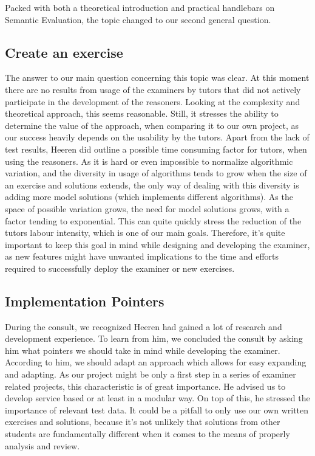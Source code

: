 Packed with both a theoretical introduction and practical handlebars on
Semantic Evaluation, the topic changed to our second general question.

\subsection{Create an exercise}
The answer to our main question concerning this topic was clear. At this moment
there are no results from usage of the examiners by tutors that did not
actively participate in the development of the reasoners. Looking at the 
complexity and theoretical approach, this seems reasonable. Still, it stresses
the ability to determine the value of the approach, when comparing it to our 
own project, as our success heavily depends on the usability by the tutors. 
Apart from the lack of test results, Heeren did outline a possible time
consuming factor for tutors, when using the reasoners. As it is hard or even 
impossible to normalize algorithmic variation, and the diversity in usage of 
algorithms tends to grow when the size of an exercise and solutions extends, 
the only way of dealing with this diversity is adding more model solutions 
(which implements different algorithms). 
As the space of possible variation grows, the need
for model solutions grows, with a factor tending to exponential. This can 
quite quickly stress the reduction of the tutors labour intensity, which is one 
of our main goals. Therefore, it's quite important to keep this goal in mind
while designing and developing the examiner, as new features might have 
unwanted implications to the time and efforts required to successfully deploy 
the \gls{examiner} or new \glspl{exercise}.

\subsection{Implementation Pointers}
During the consult, we recognized Heeren had gained a lot of research and 
development experience. To learn from him, we concluded the consult by 
asking him what pointers we should take in mind while developing the 
\gls{examiner}. According to him, we should adapt an approach which allows for 
easy expanding and adapting. As our project might be only a first step in a
series of \gls{examiner} related projects, this characteristic is of great 
importance. He advised us to develop service based or at least in a modular 
way. On top of this, he stressed the importance of relevant test data. It
could be a pitfall to only use our own written exercises and solutions, because
it's not unlikely that solutions from other students are fundamentally 
different when it comes to the means of properly analysis and review.


